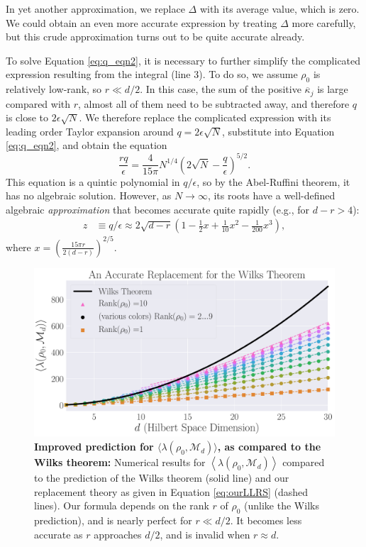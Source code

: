 \documentclass[aps,pra, twocolumn]{revtex4-1}
\newcommand{\M}{\mathcal{M}}
\newcommand{\expect}[1]{\ensuremath{\left\langle#1\right\rangle}}
\begin{document}
In yet another approximation, we replace $\Delta$ with its average value, which is zero.  We could obtain an even more accurate expression 
 by treating $\Delta$ more carefully, but this crude approximation turns out to be quite accurate already.

To solve Equation \eqref{eq:q_eqn2}, it is necessary to further simplify the complicated expression resulting from the integral (line 3).  To do so, we 
assume  $\rho_0$ is relatively low-rank, so $r \ll d/2$.  In this case, the sum of the positive $\overline{\kappa}_j$ is large compared 
with $r$, almost all of them need to be subtracted away, and therefore $q$ is close to $2\epsilon\sqrt{N}$.  We therefore replace 
the complicated expression with its leading order Taylor expansion around $q=2\epsilon\sqrt{N}$, substitute into Equation \eqref{eq:q_eqn2}, and 
obtain the equation
\begin{equation}
\frac{rq}{\epsilon}  = \frac{4}{15\pi}N^{1/4}\left(2\sqrt{N}-\frac{q}{\epsilon}\right)^{5/2}.
\end{equation}
This equation is a quintic polynomial in $q/\epsilon$, so by the Abel-Ruffini theorem, it has no algebraic solution.  However, as $N \rightarrow \infty$, its roots have a well-defined algebraic \emph{approximation} that becomes accurate quite rapidly (e.g., for $d-r>4$):
\begin{align}
\label{eq:truncation}
z &\equiv q/\epsilon \approx 2\sqrt{d-r}\left(1 -\frac{1}{2}x +\frac{1}{10}x^{2} - \frac{1}{200}x^{3}\right),
\end{align}
where $x = \left(\frac{15 \pi r}{2(d-r)}\right)^{2/5}$.

\begin{figure}
 \includegraphics[width=\columnwidth]{Images/Figure_9.pdf}
 \caption{\textbf{Improved prediction for $\langle \lambda(\rho_{0}, \M_{d})\rangle$, as compared to the Wilks theorem:} Numerical results for $\expect{\lambda(\rho_{0}, \M_{d})}$ compared to the prediction of the Wilks theorem (solid line) and our replacement theory as given in Equation \eqref{eq:ourLLRS} (dashed lines).  Our formula depends on the rank $r$ of $\rho_0$ (unlike the Wilks prediction), and is nearly perfect for $r\ll d/2$.  It becomes less accurate as $r$ approaches $d/2$, and is invalid when $r\approx d$.}
 \label{fig:modelcomp-iso}
\end{figure}
\end{document}
